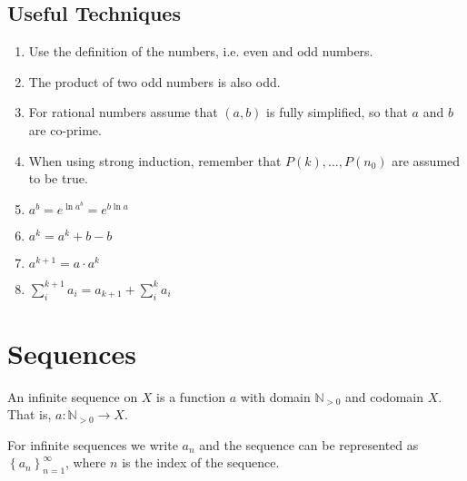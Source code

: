 \documentclass{article}
\newcommand*{\N}{\mathbb{N}}
\theoremstyle{plain}
\numberwithin{theorem}{subsection}
\theoremstyle{definition}
\numberwithin{definition}{subsection}
\theoremstyle{remark}
\numberwithin{note}{subsection}
\begin{document}
\subsection{Useful Techniques}
\nopagebreak
\begin{multicols}{2}
\begin{enumerate}
    \item Use the definition of the numbers, i.e. even and odd numbers.
    \item The product of two odd numbers is also odd.
    \item For rational numbers assume that $(a,b)$ is fully simplified, so that $a$ and $b$ are co-prime.
    \item When using strong induction, remember that $P(k), \ldots, P(n_0)$ are assumed to be true.
    \columnbreak
    \item $a^b=e^{\ln{a^b}}=e^{b\ln{a}}$
    \item $a^k = a^k + b - b$
    \item $a^{k+1} = a \cdot a^k$
    \item $\sum_{i}^{k+1} a_i = a_{k+1} + \sum_{i}^{k} a_i$
\end{enumerate}
\end{multicols}
%
\section{Sequences}
An infinite sequence on $X$ is a function $a$ with domain $\N_{> 0}$ and codomain $X$. That is, $a:\N_{> 0}\to X$.

For infinite sequences we write $a_n$ and the sequence can be represented as $\left\{a_n\right\}_{n=1}^\infty$, where $n$ is the index of the sequence.
%
\end{document}

